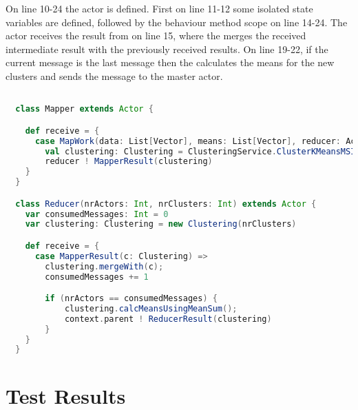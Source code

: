 On line 10-24 the  actor is defined. First on line 11-12 some isolated state variables are defined, followed by the behaviour method scope on line 14-24.
The  actor receives the result from  on line 15, where the  merges the received intermediate result with the previously received results. On line 19-22, if the current message is the last message then the  calculates the means for the new clusters and sends the  message to the master actor.

\begin{lstlisting}[float,label=lst:actor_implementation,
  caption={Actor Implementation},
  language=Scala,  
  showspaces=false,
  showtabs=false,
  breaklines=true,
  showstringspaces=false,
  breakatwhitespace=true,
  commentstyle=\color{greencomments},
  keywordstyle=\color{bluekeywords},
  stringstyle=\color{redstrings}]  % Start your code-block

  class Mapper extends Actor {

    def receive = {
      case MapWork(data: List[Vector], means: List[Vector], reducer: ActorRef) =>
        val clustering: Clustering = ClusteringService.ClusterKMeansMSIncremental(data, means)
        reducer ! MapperResult(clustering)
    }
  }

  class Reducer(nrActors: Int, nrClusters: Int) extends Actor {
    var consumedMessages: Int = 0
    var clustering: Clustering = new Clustering(nrClusters)

    def receive = {
      case MapperResult(c: Clustering) =>
        clustering.mergeWith(c);
        consumedMessages += 1

        if (nrActors == consumedMessages) {
            clustering.calcMeansUsingMeanSum();
            context.parent ! ReducerResult(clustering)
        }
    }
  }  
\end{lstlisting}


\section{Test Results}


